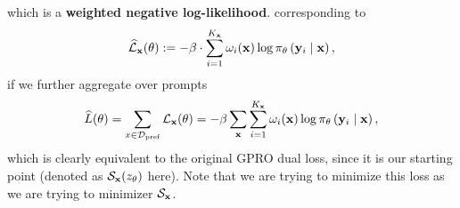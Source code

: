 \documentclass[11pt]{article}  %
\begin{document}
which is a \textbf{weighted negative log-likelihood}. corresponding to 
\begin{align*}
  \widehat{\mathcal{L}}_{\mathbf{x}}(\theta) := -\beta \cdot \sum_{i=1}^{{K_{\mathbf{x}}}}\omega_i(\mathbf{x}) \log \pi_{\theta}\left( \mathbf{y}_i \mid \mathbf{x} \right),
\end{align*}
if we further aggregate over prompts 
\begin{align*}
  \widehat{L}(\theta) =  \sum_{x \in \mathcal{D}_{\text{pref}}} \mathcal{L}_{\mathbf{x}}(\theta) = -\beta \sum_{\mathbf{x}} \sum_{i=1}^{K_{\mathbf{x}}} \omega_i(\mathbf{x})\log \pi_{\theta}\left( \mathbf{y}_i \mid \mathbf{x} \right),
\end{align*}
which is clearly equivalent to the original GPRO dual loss, since it is our starting point (denoted as $\mathcal{S}_{\mathbf{x}}(z_\theta)$ here). 
Note that we are trying to minimize this loss as we are trying to minimizer $\mathcal{S}_{\mathbf{x}}$.
\end{document}
